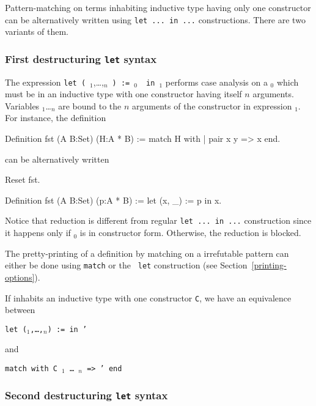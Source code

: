Pattern-matching on terms inhabiting inductive type having only one
constructor can be alternatively written using {\tt let ... in ...}
constructions. There are two variants of them.

\subsubsection{First destructuring {\tt let} syntax}
The expression {\tt let
(}~{\ident$_1$},\ldots,{\ident$_n$}~{\tt ) :=}~{\term$_0$}~{\tt
in}~{\term$_1$} performs case analysis on a {\term$_0$} which must be in
an inductive type with one constructor having itself $n$ arguments. Variables
{\ident$_1$}\ldots{\ident$_n$} are bound to the $n$ arguments of the
constructor in expression {\term$_1$}. For instance, the definition

\begin{coq_example}
Definition fst (A B:Set) (H:A * B) := match H with
                                      | pair x y => x
                                      end.
\end{coq_example}

can be alternatively written 

\begin{coq_eval}
Reset fst.
\end{coq_eval}
\begin{coq_example}
Definition fst (A B:Set) (p:A * B) := let (x, _) := p in x.
\end{coq_example}
Notice that reduction is different from regular {\tt let ... in ...}
construction since it happens only if {\term$_0$} is in constructor
form. Otherwise, the reduction is blocked.

The pretty-printing of a definition by matching on a
irrefutable pattern can either be done using {\tt match} or the {\tt
let} construction (see Section~\ref{printing-options}).

If {\term} inhabits an inductive type with one constructor {\tt C},
we have an equivalence between

{\tt let ({\ident}$_1$,\ldots,{\ident}$_n$) \zeroone{\ifitem} := {\term} in {\term}'}

\noindent and

{\tt match {\term} \zeroone{\ifitem} with C {\ident}$_1$ {\ldots} {\ident}$_n$ \verb!=>! {\term}' end}


\subsubsection{Second destructuring {\tt let} syntax}

